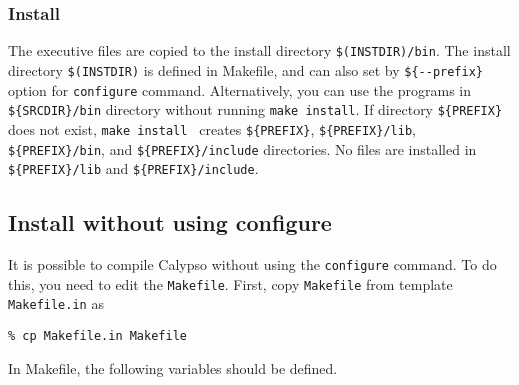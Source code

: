 \subsubsection{Install}
 The executive files are copied to the install directory \verb|$(INSTDIR)/bin|. The install directory \verb|$(INSTDIR)| is defined in Makefile, and can also set by  \verb|${--prefix}| option for \verb|configure| command. Alternatively, you can use the programs in \verb|${SRCDIR}/bin| directory without running \verb|make install|. If directory \verb|${PREFIX}| does not exist, \verb|make install | creates  \verb|${PREFIX}|,  \verb|${PREFIX}/lib|,  \verb|${PREFIX}/bin|, and  \verb|${PREFIX}/include| directories. No files are installed in \verb|${PREFIX}/lib| and \verb|${PREFIX}/include|.

\subsection{Install without using configure}
\label{section:no_configure}
It is possible to compile Calypso without using the \verb|configure| command. To do this, you need to edit the \verb|Makefile|. First, copy \verb|Makefile| from template \verb|Makefile.in| as
%
\begin{verbatim}
% cp Makefile.in Makefile
\end{verbatim}
In Makefile, the following variables should be defined.
%
